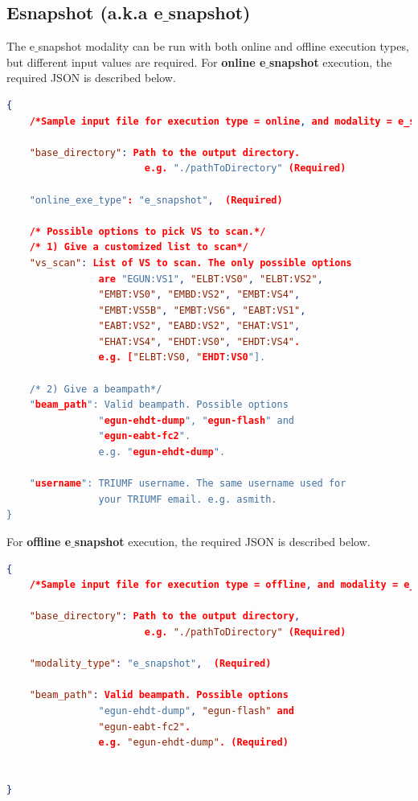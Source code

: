 \documentclass{article}
\begin{document}
\subsection{Esnapshot (a.k.a e$\_$snapshot)}
The e$\_$snapshot modality can be run with both online and offline execution types, but different input values are required. For \textbf{online e$\_$snapshot} execution, the required JSON is described below. 
\begin{lstlisting}[language=json,firstnumber=0]
{
    /*Sample input file for execution type = online, and modality = e_snapshot */

    "base_directory": Path to the output directory.
                        e.g. "./pathToDirectory" (Required)
    
    "online_exe_type": "e_snapshot",  (Required)

    /* Possible options to pick VS to scan.*/
    /* 1) Give a customized list to scan*/
    "vs_scan": List of VS to scan. The only possible options 
                are "EGUN:VS1", "ELBT:VS0", "ELBT:VS2", 
                "EMBT:VS0", "EMBD:VS2", "EMBT:VS4",
                "EMBT:VS5B", "EMBT:VS6", "EABT:VS1",
                "EABT:VS2", "EABD:VS2", "EHAT:VS1", 
                "EHAT:VS4", "EHDT:VS0", "EHDT:VS4".
                e.g. ["ELBT:VS0, "EHDT:VS0"]. 
                
    /* 2) Give a beampath*/
    "beam_path": Valid beampath. Possible options 
                "egun-ehdt-dump", "egun-flash" and
                "egun-eabt-fc2". 
                e.g. "egun-ehdt-dump".
                
    "username": TRIUMF username. The same username used for 
                your TRIUMF email. e.g. asmith.
}
\end{lstlisting}  
 For \textbf{offline  e$\_$snapshot} execution, the required JSON is described below.
\begin{lstlisting}[language=json,firstnumber=0]
{
    /*Sample input file for execution type = offline, and modality = e_snapshot */
    
    "base_directory": Path to the output directory, 
                        e.g. "./pathToDirectory" (Required)
    
    "modality_type": "e_snapshot",  (Required)

    "beam_path": Valid beampath. Possible options 
                "egun-ehdt-dump", "egun-flash" and
                "egun-eabt-fc2". 
                e.g. "egun-ehdt-dump". (Required)

    
}
\end{lstlisting}
\end{document}

